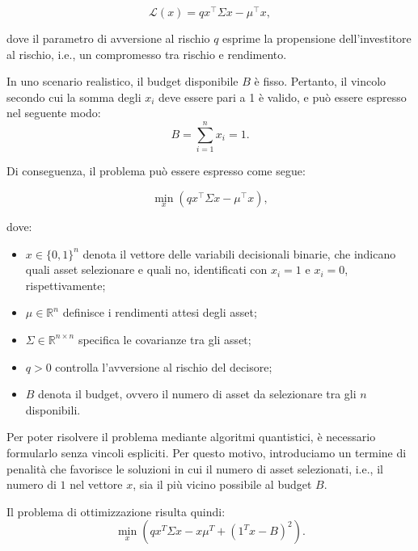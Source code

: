 \begin{equation}\label{eqn:funzioneObiettivo}
    \mathcal{L}(x) = q x^\top \Sigma x - \mu^\top x,
\end{equation}

dove il parametro di avversione al rischio \(q\) esprime la propensione 
dell'investitore al rischio, i.e., un compromesso tra rischio e rendimento.


In uno scenario realistico, il budget disponibile \(B\) è fisso. Pertanto, il 
vincolo secondo cui la somma degli \(x_i\) deve essere pari a 1 è valido, e può essere 
espresso nel seguente modo: 
\begin{equation}\label{eqn:vincoloBudget}
    B = \sum_{i=1}^n x_i = 1.
\end{equation}

Di conseguenza, il problema può essere espresso come segue:

\begin{equation}\label{eqn:funzioneProblema}
    \min_x (q x^\top \Sigma x - \mu^\top x),
\end{equation}

dove:
\begin{itemize}
    \item $x \in \{0,1\}^n$ denota il vettore delle variabili decisionali binarie, 
        che indicano quali asset selezionare e quali no, identificati con $x_i = 1$ 
        e $x_i = 0$, rispettivamente;
    \item $\mu \in \mathbb{R}^n$ definisce i rendimenti attesi degli asset;
    \item $\Sigma \in \mathbb{R}^{n \times n}$ specifica le covarianze tra gli asset;
    \item $q > 0$ controlla l'avversione al rischio del decisore;
    \item $B$ denota il budget, ovvero il numero di asset da selezionare tra gli $n$ 
        disponibili.
\end{itemize}

Per poter risolvere il problema mediante algoritmi quantistici, è necessario formularlo 
senza vincoli espliciti. Per questo motivo, introduciamo un termine di penalità che 
favorisce le soluzioni in cui il numero di asset selezionati, i.e., il numero di $1$ 
nel vettore $x$, sia il più vicino possibile al budget $B$.

Il problema di ottimizzazione risulta quindi:
\begin{equation}\label{eqn:funzioneProblemaConVincolo}
    \min_x \left(qx^T\Sigma x - x\mu^T + {({1}^T x - B)}^2\right).
\end{equation}

